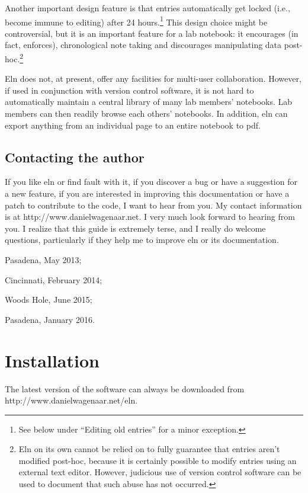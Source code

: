 \documentclass[11pt]{report}
\begin{document}
Another important design feature is that entries automatically get
locked (i.e., become immune to editing) after 24 hours.\footnote{See
  below under ``Editing old entries'' for a minor exception.} This
design choice might be controversial, but it is an important feature
for a lab notebook: it encourages (in fact, enforces), chronological
note taking and discourages manipulating data post-hoc.\footnote{Eln
  on its own cannot be relied on to fully guarantee that entries
  aren't modified post-hoc, because it is certainly possible to modify
  entries using an external text editor. However, judicious use of
  version control software can be used to document that such abuse has
  not occurred.}

Eln does not, at present, offer any facilities for multi-user
collaboration. However, if used in conjunction with version control
software, it is not hard to automatically maintain a central library of
many lab members' notebooks. Lab members can then readily browse each
others' notebooks. In addition, eln can export anything from an
individual page to an entire notebook to pdf.

\section{Contacting the author}

If you like eln or find fault with it, if you discover a bug or have a
suggestion for a new feature, if you are interested in improving this
documentation or have a patch to contribute to the code, I want to
hear from you. My contact information is at
http://www.danielwagenaar.net. I very much look forward to hearing
from you. I realize that this guide is extremely terse, and I
really do welcome questions, particularly if they help me to improve
eln or its documentation.\bigskip

\noindent Pasadena, May 2013;

\noindent Cincinnati, February 2014;

\noindent Woods Hole, June 2015;

\noindent Pasadena, January 2016.




\chapter{Installation}

The latest version of the software can always be downloaded from\break
http://www.danielwagenaar.net/eln.
\end{document}

